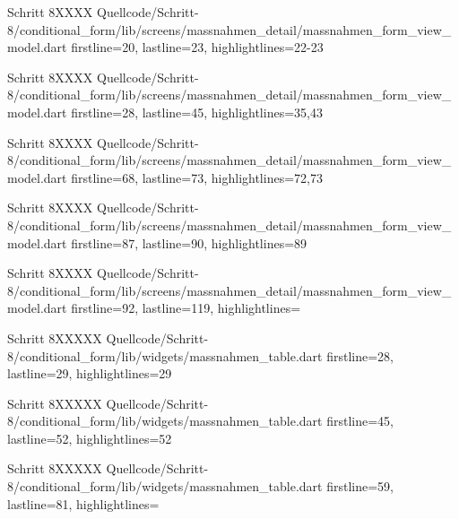   \begin{alexlisting}{Schritt 8}{XXXX}
    {Quellcode/Schritt-8/conditional_form/lib/screens/massnahmen_detail/massnahmen_form_view_model.dart}
    {firstline=20, lastline=23, highlightlines={22-23}}
    \label{lst:Schritt8XXXXX}
  \end{alexlisting}
  \begin{alexlisting}{Schritt 8}{XXXX}
    {Quellcode/Schritt-8/conditional_form/lib/screens/massnahmen_detail/massnahmen_form_view_model.dart}
    {firstline=28, lastline=45, highlightlines={35,43}}
    \label{lst:Schritt8XXXXX}
  \end{alexlisting}
  \begin{alexlisting}{Schritt 8}{XXXX}
    {Quellcode/Schritt-8/conditional_form/lib/screens/massnahmen_detail/massnahmen_form_view_model.dart}
    {firstline=68, lastline=73, highlightlines={72,73}}
    \label{lst:Schritt8XXXXX}
  \end{alexlisting}
  \begin{alexlisting}{Schritt 8}{XXXX}
    {Quellcode/Schritt-8/conditional_form/lib/screens/massnahmen_detail/massnahmen_form_view_model.dart}
    {firstline=87, lastline=90, highlightlines={89}}
    \label{lst:Schritt8XXXXX}
  \end{alexlisting}
  \begin{alexlisting}{Schritt 8}{XXXX}
    {Quellcode/Schritt-8/conditional_form/lib/screens/massnahmen_detail/massnahmen_form_view_model.dart}
    {firstline=92, lastline=119, highlightlines={}}
    \label{lst:Schritt8XXXXX}
  \end{alexlisting}

  \begin{alexlisting}{Schritt 8}{XXXXX}
    {Quellcode/Schritt-8/conditional_form/lib/widgets/massnahmen_table.dart}
    {firstline=28, lastline=29, highlightlines={29}}
    \label{lst:Schritt8XXXXX}
  \end{alexlisting}
  \begin{alexlisting}{Schritt 8}{XXXXX}
    {Quellcode/Schritt-8/conditional_form/lib/widgets/massnahmen_table.dart}
    {firstline=45, lastline=52, highlightlines={52}}
    \label{lst:Schritt8XXXXX}
  \end{alexlisting}
  \begin{alexlisting}{Schritt 8}{XXXXX}
    {Quellcode/Schritt-8/conditional_form/lib/widgets/massnahmen_table.dart}
    {firstline=59, lastline=81, highlightlines={}}
    \label{lst:Schritt8XXXXX}
  \end{alexlisting}

